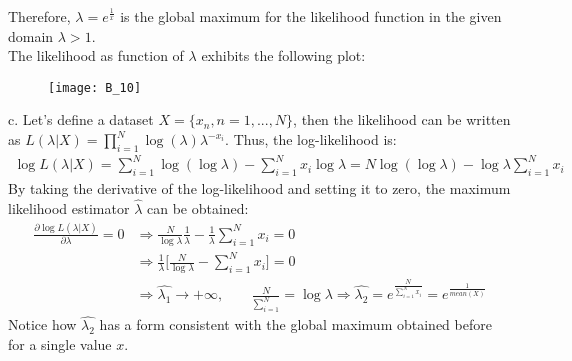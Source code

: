 Therefore, \(\lambda = e^{\frac{1}{x}}\) is the global maximum for the
likelihood function in the given domain \(\lambda>1\). \\
The likelihood as function of \(\lambda\) exhibits the following plot:
\begin{figure}[H]
    \texttt{[image: B\_10]}
    \centering
\end{figure}
c. Let's define a dataset \(X=\{x_n, n=1,...,N\}\), then the likelihood
can be written as \(L(\lambda|X)=\prod_{i=1}^{N}\log{(\lambda)}\lambda^{-x_i}\).
Thus, the log-likelihood is:
\begin{align*}
    \log{L(\lambda|X)}=\sum_{i=1}^{N}\log{(\log{\lambda})}-\sum_{i=1}^{N}x_i \log{\lambda}
    =
    N\log{(\log{\lambda})} - \log{\lambda}\sum_{i=1}^{N}x_i
\end{align*}
By taking the derivative of the log-likelihood and setting it to zero, the
maximum likelihood estimator \(\hat{\lambda}\) can be obtained:
\begin{align*}
    \frac{\partial{\log{L(\lambda|X)}}}{\partial{\lambda}}=0
    &\Rightarrow
    \frac{N}{\log{\lambda}}\frac{1}{\lambda}-\frac{1}{\lambda}\sum_{i=1}^{N}x_i=0 \\
    &\Rightarrow
    \frac{1}{\lambda}\biggl[\frac{N}{\log{\lambda}} - \sum_{i=1}^{N}x_i\biggr]=0 \\
    &\Rightarrow
    \hat{\lambda_1}\to +\infty,
    \quad\quad
    \frac{N}{\sum_{i=1}^{N}} = \log{\lambda} \Rightarrow \hat{\lambda_2}=e^{\frac{N}{\sum_{i=1}^{N}x_i}}=e^{\frac{1}{mean(X)}}
\end{align*}
Notice how \(\hat{\lambda_2}\) has a form consistent with the global maximum
obtained before for a single value \(x\).